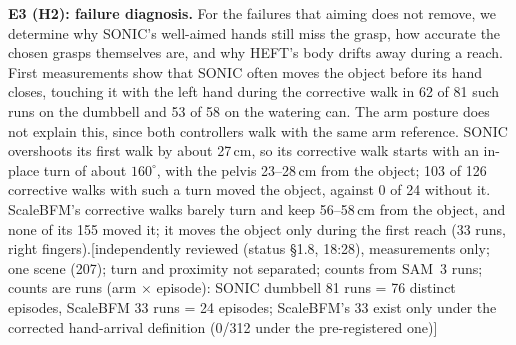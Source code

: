 \documentclass[conference]{IEEEtran}
\newif\ifdraft \drafttrue
\newcommand{\dnote}[1]{\ifdraft{\color{red}\footnotesize[#1]}\fi}
\begin{document}
\textbf{E3 (H2): failure diagnosis.} For the failures that aiming does not remove, we determine why SONIC's well-aimed hands still miss the grasp, how accurate the chosen grasps themselves are, and why HEFT's body drifts away during a reach. First measurements show that SONIC often moves the object before its hand closes, touching it with the left hand during the corrective walk in 62 of 81 such runs on the dumbbell and 53 of 58 on the watering can. The arm posture does not explain this, since both controllers walk with the same arm reference. SONIC overshoots its first walk by about 27\,cm, so its corrective walk starts with an in-place turn of about $160^\circ$, with the pelvis 23--28\,cm from the object; 103 of 126 corrective walks with such a turn moved the object, against 0 of 24 without it. ScaleBFM's corrective walks barely turn and keep 56--58\,cm from the object, and none of its 155 moved it; it moves the object only during the first reach (33 runs, right fingers).\dnote{independently reviewed (status §1.8, 18:28), measurements only; one scene (207); turn and proximity not separated; counts from SAM~3 runs; counts are runs (arm $\times$ episode): SONIC dumbbell 81 runs = 76 distinct episodes, ScaleBFM 33 runs = 24 episodes; ScaleBFM's 33 exist only under the corrected hand-arrival definition (0/312 under the pre-registered one)}
\end{document}
